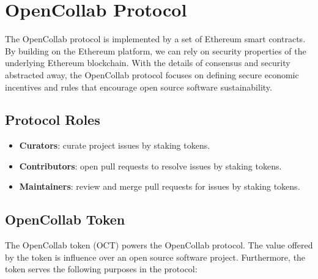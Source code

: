 \section{OpenCollab Protocol}
\label{sec:opencollab}

The OpenCollab protocol is implemented by a set of Ethereum smart contracts. By
building on the Ethereum platform, we can rely on security properties of the
underlying Ethereum blockchain. With the details of consensus and security
abstracted away, the OpenCollab protocol focuses on defining secure economic incentives
and rules that encourage open source software sustainability.

\subsection{Protocol Roles}

\begin{itemize}
  \item \textbf{Curators}: curate project issues by staking tokens.
  \item \textbf{Contributors}: open pull requests to resolve issues by staking tokens.
  \item \textbf{Maintainers}: review and merge pull requests for issues by
    staking tokens.
\end{itemize}

\subsection{OpenCollab Token}

The OpenCollab token (OCT) powers the OpenCollab protocol. The value offered by
the token is influence over an open source software project. Furthermore, the
token serves the following purposes in the protocol:

